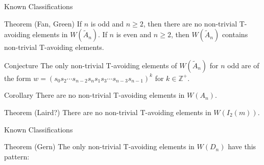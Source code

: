 \documentclass{beamer}
\newcommand\heapblock[4]{\fill[fill=#4, fill opacity=0.35, draw=#4, line width=1.1pt, rounded corners,shift={(\xxaxis:#1)},shift={(\yyaxis:#2)}] (-1,-1) rectangle (1,1);\node at (#1,#2) {\footnotesize $#3$};}
\newcommand\xxaxis{0}
\newcommand\yyaxis{90}
\begin{document}


\begin{frame}{Known Classifications}

\begin{block}{Theorem (Fan, Green)}
	If $n$ is odd and $n \geq 2$, then there are no non-trivial T-avoiding elements in $W(\widetilde{A}_n)$. If $n$ is even and $n \geq 2$, then $W(\widetilde{A}_n)$ contains non-trivial T-avoiding elements.
\end{block}
\pause
\begin{block}{Conjecture}
The only non-trivial T-avoiding elements of $W(\widetilde{A}_n)$ for $n$ odd are of the form $w=(s_0s_2 \cdots s_{n-2}s_ns_1s_3 \cdots s_{n-3}s_{n-1})^k$  for $k \in \mathbb{Z}^+$.	
\end{block}
\pause
\begin{block}{Corollary}
There are no non-trivial T-avoiding elements in $W(A_n)$.	
\end{block}
\pause
\begin{block}{Theorem (Laird?)}
	There are no non-trivial T-avoiding elements in $W(I_2(m))$.
\end{block}

\end{frame}




\begin{frame}{Known Classifications}

\begin{block}{Theorem (Gern)}
The only non-trivial T-avoiding elements in $W(D_n)$ have this pattern:	
\end{block}

\begin{figure}
\end{figure}
	
\end{frame}
\end{document}
